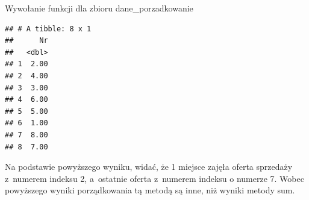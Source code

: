 \documentclass[12pt,a4paper]{report}
\begin{document}
{\begin{Shaded}
\begin{Highlighting}[]
    \NormalTok{\}}
    \NormalTok{x[,}\NormalTok{] <-}
    \NormalTok{:}
    \NormalTok{\{}
      \NormalTok{x[i,}\NormalTok{(x)]=}\NormalTok{-(odleg[i,}\NormalTok{]/d_0)}
    \NormalTok{\}}
    \NormalTok{x<-x[}\NormalTok{(-x$zmienna_syntetyczna),]}
    \NormalTok{(x[}\NormalTok{])}
    \NormalTok{\}}
\end{Highlighting}
\end{Shaded}%
Wywołanie funkcji dla zbioru dane\_porzadkowanie 
\begin{Shaded}
\begin{Highlighting}[]
\end{Highlighting}
\end{Shaded}
\begin{verbatim}
## # A tibble: 8 x 1
##      Nr
##   <dbl>
## 1  2.00
## 2  4.00
## 3  3.00
## 4  6.00
## 5  5.00
## 6  1.00
## 7  8.00
## 8  7.00
\end{verbatim}

Na podstawie powyższego wyniku, widać, że 1 miejsce zajęła oferta
sprzedaży z~numerem indeksu 2, a~ostatnie oferta z~numerem indeksu o
numerze 7. Wobec powyższego wyniki porządkowania tą metodą są inne, niż wyniki metody sum. 
}
\end{document}
